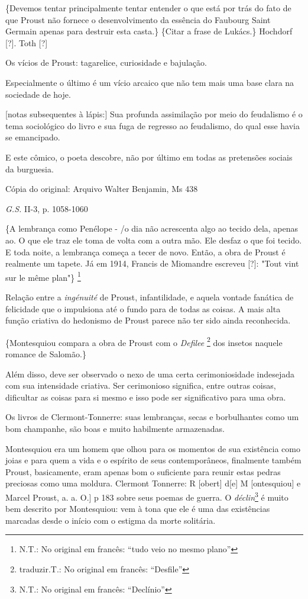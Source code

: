 \{Devemos tentar principalmente tentar entender o que está por trás do
fato de que Proust não fornece o desenvolvimento da essência do Faubourg
Saint Germain apenas para destruir esta casta.\} \{Citar a frase de
Lukács.\} Hochdorf {[}?{]}. Toth {[}?{]}

Os vícios de Proust: tagarelice, curiosidade e bajulação.

Especialmente o último é um vício arcaico que não tem mais uma base
clara na sociedade de hoje.

{[}notas subsequentes à lápis:{]} Sua profunda assimilação por meio do
feudalismo é o tema sociológico do livro e sua fuga de regresso ao
feudalismo, do qual esse havia se emancipado.

E este cômico, o poeta descobre, não por último em todas as pretensões
sociais da burguesia.

Cópia do original: Arquivo Walter Benjamin, Ms 438

\emph{G.S.} II-3, p. 1058-1060

\{A lembrança como Penélope - /o dia não acrescenta algo ao tecido dela,
apenas ao. O que ele traz ele toma de volta com a outra mão. Ele desfaz
o que foi tecido. E toda noite, a lembrança começa a tecer de novo.
Então, a obra de Proust é realmente um tapete. Já em 1914, Francis de
Miomandre escreveu {[}?{]}: "Tout vint sur le même plan"\} \footnote{N.T.:
  No original em francês: ``tudo veio no mesmo plano''}

Relação entre a \emph{ingénuité} de Proust, infantilidade, e aquela
vontade fanática de felicidade que o impulsiona até o fundo para de
todas as coisas. A mais alta função criativa do hedonismo de Proust
parece não ter sido ainda reconhecida.

\{Montesquiou compara a obra de Proust com o \emph{Defilee} \footnote{traduzir.T.:
  No original em francês: ``Desfile''} dos insetos naquele romance de
Salomão.\}

Além disso, deve ser observado o nexo de uma certa cerimoniosidade
indesejada com sua intensidade criativa. Ser cerimonioso significa,
entre outras coisas, dificultar as coisas para si mesmo e isso pode ser
significativo para uma obra.

Os livros de Clermont-Tonnerre: suas lembranças, secas e borbulhantes
como um bom champanhe, são boas e muito habilmente armazenadas.

Montesquiou era um homem que olhou para os momentos de sua existência
como joias e para quem a vida e o espírito de seus contemporâneos,
finalmente também Proust, basicamente, eram apenas bom o suficiente para
reunir estas pedras preciosas como uma moldura. Clermont Tonnerre: R
{[}obert{]} d{[}e{]} M {[}ontesquiou{]} e Marcel Proust, a. a. O.{]} p
183 sobre seus poemas de guerra. O \emph{déclin}\footnote{N.T.: No
  original em francês: ``Declínio''} é muito bem descrito por
Montesquiou: vem à tona que ele é uma das existências marcadas desde o
início com o estigma da morte solitária.

